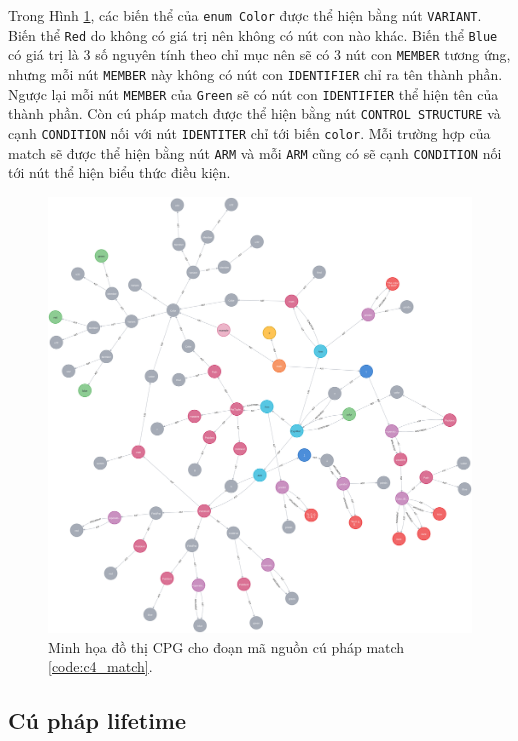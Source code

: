 Trong Hình \ref{img:c4_match}, các biến thể của \texttt{enum Color} được thể hiện bằng nút \texttt{VARIANT}.
Biến thể \texttt{Red} do không có giá trị nên không có nút con nào khác.
Biến thể \texttt{Blue} có giá trị là 3 số nguyên tính theo chỉ mục nên sẽ có 3 nút con \texttt{MEMBER} tương ứng, nhưng mỗi nút \texttt{MEMBER} này không có nút con \texttt{IDENTIFIER} chỉ ra tên thành phần.
Ngược lại mỗi nút \texttt{MEMBER} của \texttt{Green} sẽ có nút con \texttt{IDENTIFIER} thể hiện tên của thành phần.
Còn cú pháp match được thể hiện bằng nút \texttt{CONTROL STRUCTURE} và cạnh \texttt{CONDITION} nối với nút \texttt{IDENTITER} chỉ tới biến \texttt{color}.
Mỗi trường hợp của match sẽ được thể hiện bằng nút \texttt{ARM} và mỗi \texttt{ARM} cũng có sẽ cạnh \texttt{CONDITION} nối tới nút thể hiện biểu thức điều kiện.

\begin{figure}[H]
    \includegraphics[width=1\columnwidth]{figures/c4/c4_match.png}
    \centering
    \caption{Minh họa đồ thị CPG cho đoạn mã nguồn cú pháp match \ref{code:c4_match}.}
    \label{img:c4_match}
\end{figure}

\subsection{Cú pháp lifetime}

